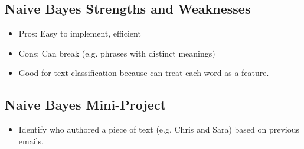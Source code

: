 \documentclass[12pt]{report}
\begin{document}
\subsection{Naive Bayes Strengths and Weaknesses}

\begin{itemize}

\item Pros: Easy to implement, efficient

\item Cons: Can break (e.g. phrases with distinct meanings)

\item Good for text classification because can treat each word as a feature. 

\end{itemize}

\subsection{Naive Bayes Mini-Project}

\begin{itemize}

\item Identify who authored a piece of text (e.g. Chris and Sara) based on previous emails. 

\end{itemize}
\end{document}
